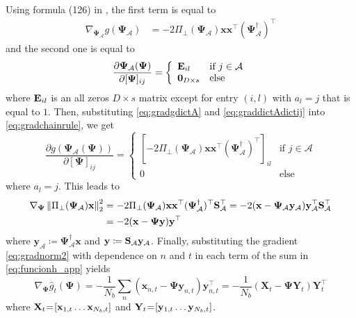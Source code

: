 \documentclass[a4paper,12pt,openany]{book}
\newcommand{\dict}{\boldsymbol{\Psi}}
\newcommand{\I}{\mathbf{I}}
\let\oldS\S
\renewcommand{\S}{\ifmmode\mathbf{S}\else\oldS\fi}
\newcommand{\X}{\mathbf{X}}
\newcommand{\Y}{\mathbf{Y}}
\newcommand{\x}{\mathbf{x}}
\newcommand{\y}{\mathbf{y}}
\newcommand{\norm}[1]{\left\|#1\right\|}
\begin{document}
\begin{appendices}
\begin{equation}
\end{equation}
Using formula (126) in \cite{matrix_cookbook}, the first term is equal to 
\begin{align}\label{eq:gradgdictA}
	\nabla_{\dict_\mathcal{A}}g(\dict_\mathcal{A})&=-2 \Pi_\perp(\dict_\mathcal{A})\x\x^\top (\dict_\mathcal{A}^\dagger)^\top%
\end{align}
and the second one is equal to 
\begin{equation}\label{eq:graddictAdictij}
	\frac{\partial \dict_\mathcal{A}(\dict)}{\partial [\dict]_{ij}}=\left\{
	\begin{array}{ll}
		\bold{E}_{il} & \textrm{if }j \in \mathcal{A}\\
		\bold{0}_{D\times s} & \textrm{else}
	\end{array} \right.
\end{equation}
where $\bold{E}_{il}$ is an all zeros $D \times s$ matrix except for entry $(i,l)$ with $a_l=j$ that is equal to $1$. Then, substituting \eqref{eq:gradgdictA} and \eqref{eq:graddictAdictij} into \eqref{eq:gradchainrule}, we get
\begin{equation}
	\frac{\partial g(\dict_\mathcal{A}(\dict))}{\partial [\dict]_{ij}}=\left\{
	\begin{array}{ll}
		\left[-2 \Pi_\perp(\dict_\mathcal{A})\x\x^\top (\dict_\mathcal{A}^\dagger)^\top\right]_{il}& \textrm{if }j \in \mathcal{A}\\
		0 & \textrm{else}
	\end{array} \right.
\end{equation}
where $a_l=j$. This leads to
\begin{align}
	\nabla_{\dict}\norm{ \Pi_\perp(\dict_{\mathcal{A}})\x}_2^2&=-2 \Pi_\perp(\dict_\mathcal{A})\x\x^\top (\dict_\mathcal{A}^\dagger)^\top\S^\top_\mathcal{A}
	=-2 (\x - \dict_\mathcal{A}\y_\mathcal{A})\y_\mathcal{A}^\top\S^\top_\mathcal{A} \nonumber \\
	&=-2 (\x - \dict\y)\y^\top \label{eq:gradnorm2}
\end{align}
where $\y_\mathcal{A}\coloneqq \dict_\mathcal{A}^\dagger\x$ and $\y\coloneqq \S_\mathcal{A}\y_\mathcal{A}$. Finally, substituting the gradient \eqref{eq:gradnorm2} with dependence on $n$ and $t$ in each term of the sum in \eqref{eq:funcionh_app} yields
\begin{equation*}
	\nabla_{\dict} \hat{g}_t(\dict) = - \frac{1}{N_b}\sum_n (\x_{n,t} - \dict\y_{n,t})\y_{n,t}^\top 
	= - \frac{1}{N_b} (\X_t - \dict \Y_t) \Y_t^\top
\end{equation*}
where $\X_t\mspace{-4mu}=\mspace{-4mu}[\x_{1,t} \ldots \x_{N_b,t}]$ and $\Y_t\mspace{-4mu}=\mspace{-4mu}[\y_{1,t} \ldots \y_{N_b,t}]$.


\end{appendices}
\end{document}
